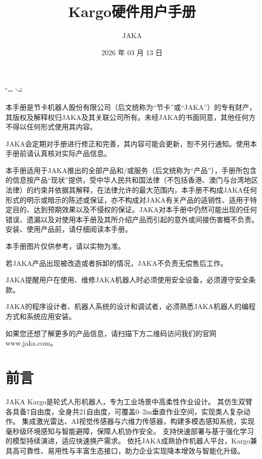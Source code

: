 \documentclass[a4paper,11pt,english,openany,oneside]{sphinxmanual}
\title{Kargo硬件用户手册}
\date{2026 年 03 月 13 日}
\author{JAKA}
\let\origsphinxtableofcontents\sphinxtableofcontents
\renewcommand{\sphinxtableofcontents}{
    \begingroup
    \cleardoublepage
    \pagenumbering{Roman}
    \pagestyle{plain} 
    \hypersetup{linkcolor=black}
    \origsphinxtableofcontents
    \clearpage
    \endgroup
    \pagenumbering{arabic}
    \pagestyle{normal}
}
\begin{document}
\ifdefined\shorthandoff
  \ifnum\catcode`\=\string=\active\shorthandoff{=}\fi
  \ifnum\catcode`\"=\active{}\fi
\fi

\pagestyle{empty}

\pagestyle{plain}
\sphinxtableofcontents
\pagestyle{normal}
\label{\detokenize{index::doc}}


\sphinxAtStartPar
本手册是节卡机器人股份有限公司（后文统称为“节卡”或“JAKA”）的专有财产，其版权及解释权归JAKA及其关联公司所有。未经JAKA的书面同意，其他任何方不得以任何形式使用其内容。

\sphinxAtStartPar
JAKA会定期对手册进行修正和完善，其内容可能会更新，恕不另行通知。使用本手册前请认真核对实际产品信息。

\sphinxAtStartPar
本手册适用于JAKA推出的全部产品和/或服务（后文统称为“产品”），手册所包含的信息按产品“现状”提供，受中华人民共和国法律（不包括香港、澳门与台湾地区法律）的约束并依据其解释，在法律允许的最大范围内，本手册不构成JAKA任何形式的明示或暗示的陈述或保证，亦不构成对JAKA有关产品的适销性、适用于特定目的、达到预期效果以及不侵权的保证。JAKA对本手册中仍然可能出现的任何错误、遗漏以及对使用本手册及其所介绍产品而引起的意外或间接伤害概不负责。安装、使用产品前，请仔细阅读本手册。

\sphinxAtStartPar
本手册图片仅供参考，请以实物为准。

\sphinxAtStartPar
若JAKA产品出现被改造或者拆卸的情况，JAKA不负责无偿售后工作。

\sphinxAtStartPar
JAKA提醒用户在使用、维修JAKA机器人时必须使用安全设备，必须遵守安全条款。

\sphinxAtStartPar
JAKA的程序设计者、机器人系统的设计和调试者，必须熟悉JAKA机器人的编程方式和系统应用安装。

\sphinxAtStartPar
{}

\sphinxAtStartPar
如果您还想了解更多的产品信息，请扫描下方二维码访问我们的官网www.jaka.com。

\begin{figure}[H]
\centering

\noindent{}
\end{figure}

\sphinxstepscope


\chapter{前言}
\label{\detokenize{02 _u524d_u8a00:id1}}\label{\detokenize{02 _u524d_u8a00::doc}}
\sphinxAtStartPar
JAKA Kargo是轮式人形机器人，专为工业场景中高柔性作业设计。
其仿生双臂各具备7自由度，全身共21自由度，可覆盖0–2m垂直作业空间，实现类人复杂动作。
集成激光雷达、AI视觉传感器与六维力传感器，构建多模态感知系统，实现毫秒级环境感知与智能避障，保障人机协作安全。
支持快速部署与基于强化学习的模型持续演进，适应快速换产需求。
依托JAKA成熟协作机器人平台，Kargo兼具高可靠性、易用性与丰富生态接口，助力企业实现降本增效与智能化升级。
\end{document}
